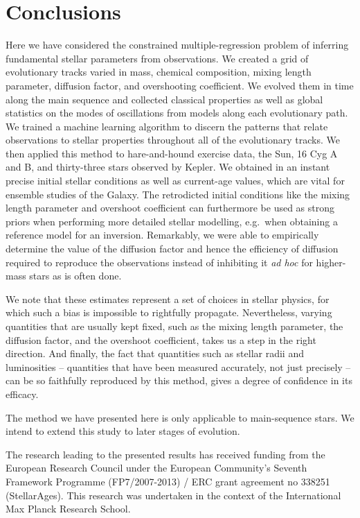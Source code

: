 \documentclass[manuscript]{aastex}
\begin{document}
\section{Conclusions}
Here we have considered the constrained multiple-regression problem of inferring fundamental stellar parameters from observations. We created a grid of evolutionary tracks varied in mass, chemical composition, mixing length parameter, diffusion factor, and overshooting coefficient. We evolved them in time along the main sequence and collected classical properties as well as global statistics on the modes of oscillations from models along each evolutionary path. We trained a machine learning algorithm to discern the patterns that relate observations to stellar properties throughout all of the evolutionary tracks. We then applied this method to hare-and-hound exercise data, the Sun, 16 Cyg A and B, and thirty-three stars observed by Kepler. We obtained in an instant precise initial stellar conditions as well as current-age values, which are vital for ensemble studies of the Galaxy. The retrodicted initial conditions like the mixing length parameter and overshoot coefficient can furthermore be used as strong priors when performing more detailed stellar modelling, e.g.~when obtaining a reference model for an inversion. Remarkably, we were able to empirically determine the value of the diffusion factor and hence the efficiency of diffusion required to reproduce the observations instead of inhibiting it \emph{ad hoc} for higher-mass stars as is often done. 

We note that these estimates represent a set of choices in stellar physics, for which such a bias is impossible to rightfully propagate. Nevertheless, varying quantities that are usually kept fixed, such as the mixing length parameter, the diffusion factor, and the overshoot coefficient, takes us a step in the right direction. And finally, the fact that quantities such as stellar radii and luminosities -- quantities that have been measured accurately, not just precisely -- can be so faithfully reproduced by this method, gives a degree of confidence in its efficacy. 

The method we have presented here is only applicable to main-sequence stars. We intend to extend this study to later stages of evolution. 


\acknowledgments The research leading to the presented results has received funding from the European Research Council under the European Community's Seventh Framework Programme (FP7/2007-2013) / ERC grant agreement no 338251 (StellarAges). This research was undertaken in the context of the International Max Planck Research School. 
\end{document}

